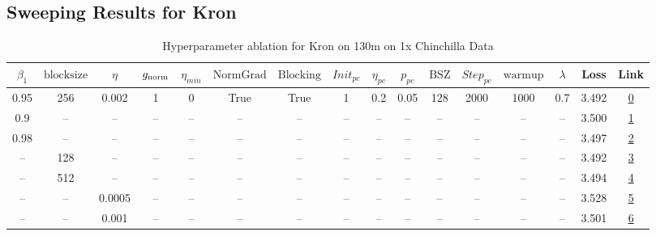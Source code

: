 \subsection{Sweeping Results for Kron}%
\begin{table}[H]
\centering
\caption{Hyperparameter ablation for Kron on 130m on 1x Chinchilla Data}
\label{tab:ablation_kron_130m_on_1x_chinchilla_data}
\begin{tabular}{cccccccccccccccc}
\toprule
$\beta_1$ & $\mathrm{block size}$ & $\eta$ & $g_{\mathrm{norm}}$ & $\eta_{min}$ & $\mathrm{NormGrad}$ & $\mathrm{Blocking}$ & $Init_{pc}$ & $\eta_{pc}$ & $p_{pc}$ & $\mathrm{BSZ}$ & $Step_{pc}$ & $\mathrm{warmup}$ & $\lambda$ & Loss & Link \\
\midrule
0.95 & 256 & 0.002 & 1 & 0 & True & True & 1 & 0.2 & 0.05 & 128 & 2000 & 1000 & 0.7 & 3.492 & \href{https://wandb.ai/marin-community/optimizer-scaling/runs/sweep-130m-2B-kron811b3clr0.002-wd0.7-b10.95-plr0.2-pis1-gn1-nor-45d11f}{0} \\
\midrule
0.9 & -- & -- & -- & -- & -- & -- & -- & -- & -- & -- & -- & -- & -- & 3.500 & \href{https://wandb.ai/marin-community/optimizer-scaling/runs/sweep-130m-2B-kron18ad0flr0.002-wd0.7-b10.9-plr0.2-pis1-gn1-norm-7cd768}{1} \\
0.98 & -- & -- & -- & -- & -- & -- & -- & -- & -- & -- & -- & -- & -- & 3.497 & \href{https://wandb.ai/marin-community/optimizer-scaling/runs/sweep-130m-2B-kron13e12blr0.002-wd0.7-b10.98-plr0.2-pis1-gn1-nor-259ac0}{2} \\
-- & 128 & -- & -- & -- & -- & -- & -- & -- & -- & -- & -- & -- & -- & 3.492 & \href{https://wandb.ai/marin-community/optimizer-scaling/runs/sweep-130m-2B-kroncd6d30lr0.002-wd0.7-b10.95-plr0.2-pis1-gn1-nor-1527d0}{3} \\
-- & 512 & -- & -- & -- & -- & -- & -- & -- & -- & -- & -- & -- & -- & 3.494 & \href{https://wandb.ai/marin-community/optimizer-scaling/runs/sweep-130m-2B-krond41926lr0.002-wd0.7-b10.95-plr0.2-pis1-gn1-nor-e72480}{4} \\
-- & -- & 0.0005 & -- & -- & -- & -- & -- & -- & -- & -- & -- & -- & -- & 3.528 & \href{https://wandb.ai/marin-community/optimizer-scaling/runs/sweep-130m-2B-kron6787f2lr0.0005-wd0.7-b10.95-plr0.2-pis1-gn1-no-d99f80}{5} \\
-- & -- & 0.001 & -- & -- & -- & -- & -- & -- & -- & -- & -- & -- & -- & 3.501 & \href{https://wandb.ai/marin-community/optimizer-scaling/runs/sweep-130m-2B-kron5fbd9blr0.001-wd0.7-b10.95-plr0.2-pis1-gn1-nor-fbd5ad}{6} \\

\end{tabular}
\end{table}
